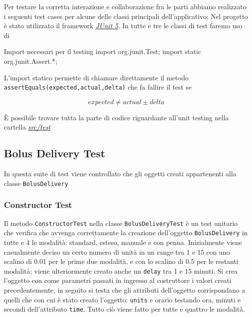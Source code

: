 \documentclass[twocolumn]{article}
\begin{document}
Per testare la corretta interazione e collaborazione fra le parti abbiamo realizzato i seguenti test cases per alcune delle classi principali dell’applicativo:
Nel progetto è stato utilizzato il framework \href{https://junit.org/junit5/}{\textit{JUnit 5}}.
In tutte e tre le classi di test faremo uso di
\begin{javaCode} {Import necessari per il testing}
import org.junit.Test;
import static org.junit.Assert.*;
\end{javaCode}
L'import statico permette di chiamare direttamente il metodo \texttt{assertEquals(expected,actual,delta)} che fa fallire il test se

\[expected \neq actual \pm delta\]

È possibile trovare tutta la parte di codice riguardante all'unit testing nella cartella \href{https://github.com/federicomarra/swe-diab/tree/master/src/test}{\textit{src/test}}

\subsection{Bolus Delivery Test}
In questa suite di test viene controllato che gli oggetti creati appartenenti alla classe \texttt{BolusDelivery} 

\subsubsection{Constructor Test}
Il metodo \texttt{ConstructorTest} nella classe \texttt{BolusDeliveryTest} è un test unitario che verifica che avvenga correttamente la creazione dell'oggetto \texttt{BolusDelivery} in tutte e 4 le modalità: standard, esteso, manuale e con penna. Inizialmente viene casualmente deciso un certo numero di unità in un range tra 1 e 15 con uno scalino di 0.01 per le prime due modalità, e con lo scalino di 0.5 per le restanti modalità; viene ulteriormente creato anche un \texttt{delay} tra 1 e 15 minuti. Si crea l'oggetto con come parametri passati in ingresso al costruttore i valori creati precedentemente, in seguito si testa che gli attributi dell'oggetto corrispondano a quelli che con cui è stato creato l'oggetto: \texttt{units} e orario testando ora, minuti e secondi dell'attributo \texttt{time}. Tutto ciò viene fatto per tutte e quattro le modalità.
\end{document}
